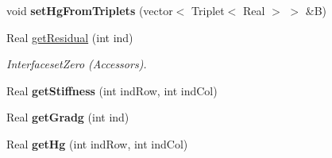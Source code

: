 \begin{DoxyCompactItemize}
\item 
\hypertarget{structvoom_1_1_eigen_elliptic_result_a50c77f1b26e45ce4627ac1060b83a456}{
void {\bfseries setHgFromTriplets} (vector$<$ Triplet$<$ Real $>$ $>$ \&B)}
\label{structvoom_1_1_eigen_elliptic_result_a50c77f1b26e45ce4627ac1060b83a456}

\item 
\hypertarget{structvoom_1_1_eigen_elliptic_result_a45599f5067cc01cb09b56ceb348a3788}{
Real \hyperlink{structvoom_1_1_eigen_elliptic_result_a45599f5067cc01cb09b56ceb348a3788}{getResidual} (int ind)}
\label{structvoom_1_1_eigen_elliptic_result_a45599f5067cc01cb09b56ceb348a3788}

\begin{DoxyCompactList}\small\item\em InterfacesetZero (Accessors). \item\end{DoxyCompactList}\item 
\hypertarget{structvoom_1_1_eigen_elliptic_result_abb3450dd9bb60bf661f4710324085b10}{
Real {\bfseries getStiffness} (int indRow, int indCol)}
\label{structvoom_1_1_eigen_elliptic_result_abb3450dd9bb60bf661f4710324085b10}

\item 
\hypertarget{structvoom_1_1_eigen_elliptic_result_a3f9cd0fed3c20c7eb638659f882377f6}{
Real {\bfseries getGradg} (int ind)}
\label{structvoom_1_1_eigen_elliptic_result_a3f9cd0fed3c20c7eb638659f882377f6}

\item 
\hypertarget{structvoom_1_1_eigen_elliptic_result_a2dd2e46086c7ab0032909137acb93f26}{
Real {\bfseries getHg} (int indRow, int indCol)}
\label{structvoom_1_1_eigen_elliptic_result_a2dd2e46086c7ab0032909137acb93f26}

\end{DoxyCompactItemize}
